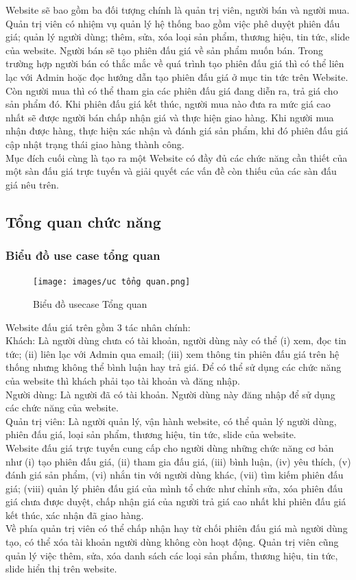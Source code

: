 \documentclass{article}
\begin{document}
Website sẽ bao gồm ba đối tượng chính là quản trị viên, người bán và người mua. Quản trị viên có nhiệm vụ quản lý hệ thống bao gồm việc phê duyệt phiên đấu giá; quản lý người dùng; thêm, sửa, xóa loại sản phẩm, thương hiệu, tin tức, slide của website. Người bán sẽ tạo phiên đấu giá về sản phẩm muốn bán. Trong trường hợp người bán có thắc mắc về quá trình tạo phiên đấu giá thì có thể liên lạc với Admin hoặc đọc hướng dẫn tạo phiên đấu giá ở mục tin tức trên Website. Còn người mua thì có thể tham gia các phiên đấu giá đang diễn ra, trả giá cho sản phẩm đó. Khi phiên đấu giá kết thúc, người mua nào đưa ra mức giá cao nhất sẽ được người bán chấp nhận giá và thực hiện giao hàng. Khi người mua nhận được hàng, thực hiện xác nhận và đánh giá sản phẩm, khi đó phiên đấu giá cập nhật trạng thái giao hàng thành công.\\
Mục đích cuối cùng là tạo ra một Website có đầy đủ các chức năng cần thiết của một sàn đấu giá trực tuyến và giải quyết các vấn đề còn thiếu của các sàn đấu giá nêu trên.
\subsection{Tổng quan chức năng}
\subsubsection{Biểu đồ use case tổng quan}
\begin{figure}[H]
    \centering
    \texttt{[image: images/uc tổng quan.png]}
    \caption{Biểu đồ usecase Tổng quan}
    \label{hinh21}
\end{figure}
Website đấu giá trên gồm 3 tác nhân chính:\\ 
Khách: Là người dùng chưa có tài khoản, người dùng này có thể (i) xem, đọc tin tức; (ii) liên lạc với Admin qua email; (iii) xem thông tin phiên đấu giá trên hệ thống nhưng không thể bình luận hay trả giá. Để có thể sử dụng các chức năng của website thì khách phải tạo tài khoản và đăng nhập.\\
Người dùng: Là người đã có tài khoản. Người dùng này đăng nhập để sử dụng các chức năng của website. \\
Quản trị viên: Là người quản lý, vận hành website, có thể quản lý người dùng, phiên đấu giá, loại sản phẩm, thương hiệu, tin tức, slide của website. \\
Website đấu giá trực tuyến cung cấp cho người dùng những chức năng cơ bản như (i) tạo phiên đấu giá, (ii) tham gia đấu giá, (iii) bình luận, (iv) yêu thích, (v) đánh giá sản phẩm, (vi) nhắn tin với người dùng khác, (vii) tìm kiếm phiên đấu giá; (viii) quản lý phiên đấu giá của mình tổ chức như chỉnh sửa, xóa phiên đấu giá chưa được duyệt, chấp nhận giá của người trả giá cao nhất khi phiên đấu giá kết thúc, xác nhận đã giao hàng.\\
Về phía quản trị viên có thể chấp nhận hay từ chối phiên đấu giá mà người dùng tạo, có thể xóa tài khoản người dùng không còn hoạt động. Quản trị viên cũng quản lý việc thêm, sửa, xóa danh sách các loại sản phẩm, thương hiệu, tin tức, slide hiển thị trên website.
\end{document}
